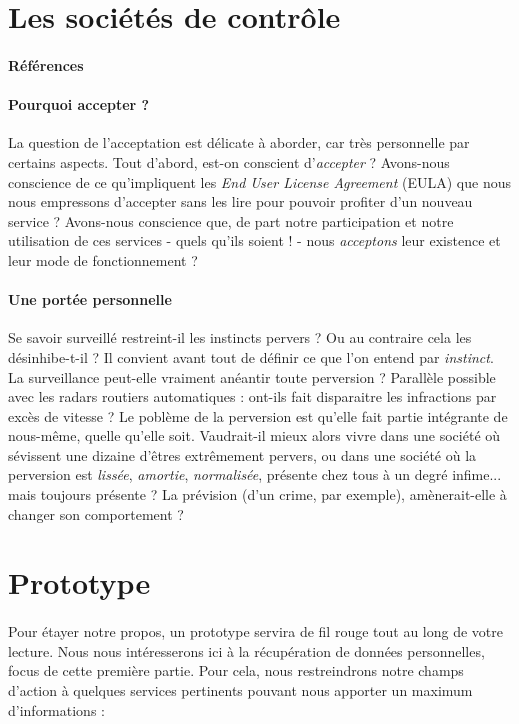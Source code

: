 \section{Les sociétés de contrôle}
\paragraph{Références} \cite{Huxley0} \cite{Orwell0} \cite{TechnoSocio1}

\paragraph{Pourquoi accepter ?} La question de l'acceptation est délicate à aborder, car
très personnelle par certains aspects. Tout d'abord, est-on conscient d'\emph{accepter} ?
Avons-nous conscience de ce qu'impliquent les \emph{End User License Agreement} (EULA) que
nous nous empressons d'accepter sans les lire pour pouvoir profiter d'un nouveau service ?
Avons-nous conscience que, de part notre participation et notre utilisation de ces services
- quels qu'ils soient ! - nous \emph{acceptons} leur existence et leur mode de fonctionnement ?

\paragraph{Une portée personnelle} Se savoir surveillé restreint-il les instincts pervers ?
Ou au contraire cela les désinhibe-t-il ? Il convient avant tout de définir ce que l'on
entend par \emph{instinct}. La surveillance peut-elle vraiment anéantir toute perversion ?
Parallèle possible avec les radars routiers automatiques : ont-ils fait disparaitre les
infractions par excès de vitesse ? Le poblème de la perversion est qu'elle fait partie
intégrante de nous-même, quelle qu'elle soit. Vaudrait-il mieux alors vivre dans une société
où sévissent une dizaine d'êtres extrêmement pervers, ou dans une société où la perversion
est \emph{lissée}, \emph{amortie}, \emph{normalisée}, présente chez tous à un degré infime...
mais toujours présente ? La prévision (d'un crime, par exemple), amènerait-elle à changer
son comportement ?


\section*{Prototype}

\paragraph{} Pour étayer notre propos, un prototype servira de fil rouge tout au
long de votre lecture. Nous nous intéresserons ici à la récupération de données personnelles,
focus de cette première partie. Pour cela, nous restreindrons notre champs d'action à quelques
services pertinents pouvant nous apporter un maximum d'informations :

